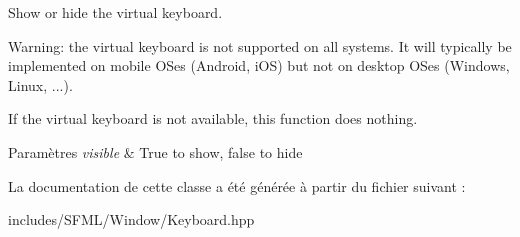 Show or hide the virtual keyboard. 

Warning\+: the virtual keyboard is not supported on all systems. It will typically be implemented on mobile O\+Ses (Android, i\+OS) but not on desktop O\+Ses (Windows, Linux, ...).

If the virtual keyboard is not available, this function does nothing.


\begin{DoxyParams}{Paramètres}
{\em visible} & True to show, false to hide \\
\hline
\end{DoxyParams}


La documentation de cette classe a été générée à partir du fichier suivant \+:\begin{DoxyCompactItemize}
\item 
includes/\+S\+F\+M\+L/\+Window/Keyboard.\+hpp\end{DoxyCompactItemize}

